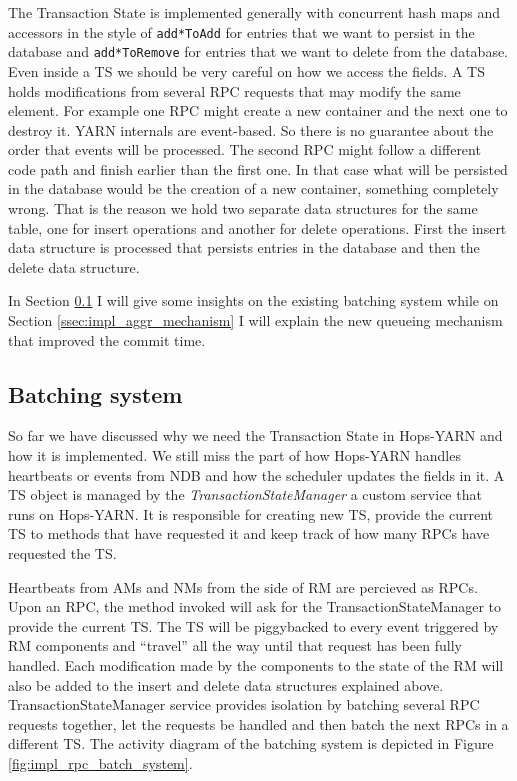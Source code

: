 The Transaction State is implemented generally with concurrent hash maps and
accessors in the style of \texttt{add*ToAdd} for entries that we
want to persist in the database and \texttt{add*ToRemove} for entries
that we want to delete from the database. Even inside a TS we should
be very careful on how we access the fields. A TS holds modifications
from several RPC requests that may modify the same element. For
example one RPC might create a new container and the next one to
destroy it. YARN internals are event-based. So there is no guarantee
about the order that events will be processed. The second RPC might
follow a different code path and finish earlier than the first one. In
that case what will be persisted in the database would be the creation
of a new container, something completely wrong. That is the reason
we hold two separate data structures for the same table, one for
insert operations and another for delete operations. First the insert
data structure is processed that persists entries in the database and
then the delete data structure.

In Section \ref{ssec:impl_batch_system} I will give some insights on
the existing batching system while on Section
\ref{ssec:impl_aggr_mechanism} I will explain the new queueing
mechanism that improved the commit time.

\subsection{Batching system}
\label{ssec:impl_batch_system}
So far we have discussed why we need the Transaction State in
Hops-YARN and how it is implemented. We still miss the part of how
Hops-YARN handles heartbeats or events from NDB and how the scheduler
updates the fields in it. A TS object is managed by the
\emph{TransactionStateManager} a custom service that runs on Hops-YARN.
It is responsible for creating new TS, provide the
current TS to methods that have requested it and keep track of how many
RPCs have requested the TS.

Heartbeats from AMs and NMs from the side of RM are percieved as
RPCs. Upon an RPC, the method invoked will ask for the TransactionStateManager
to provide the current TS. The TS will be piggybacked to every event
triggered by RM components and ``travel'' all the way until that
request has been fully handled. Each modification made by the components
to the state of the RM will also be added to the insert and delete
data structures explained above. TransactionStateManager service
provides isolation by batching several RPC requests together, let the
requests be handled and then batch the next RPCs in a different
TS. The activity diagram of the batching system is depicted in Figure
\ref{fig:impl_rpc_batch_system}.

